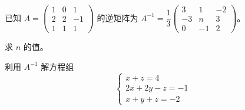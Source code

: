 \documentclass[12pt,a4paper]{exam-zh}
\newcommand{\qscoreoffset}{4em}
\newcommand{\qscore}[2][\%]{%
    \leavevmode\unskip\nobreak\hfill
    \makebox[0pt][l]{\makebox[\qscoreoffset][r]{(#2#1)}}%
}
\begin{document}
\begin{question}[points = 6]
    已知 $A=\begin{pmatrix}1&0&1\\2&2&-1\\1&1&1\end{pmatrix}$ 的逆矩阵为 $A^{-1}=\dfrac{1}{3}\begin{pmatrix}3&1&-2\\-3&n&3\\0&-1&2\end{pmatrix}$。
    \begin{questionparts}
        \item 求 $n$ 的值。 \qscore{2}
        \item 利用 $A^{-1}$ 解方程组
        \[
            \begin{cases}
                x+z=4 \\
                2x+2y-z=-1 \\
                x+y+z=-2
            \end{cases}
        \]
        \qscore{4}
    \end{questionparts}
\end{question}
\end{document}
